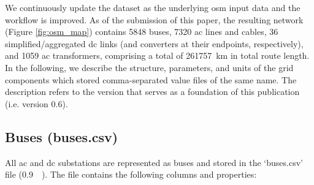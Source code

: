 \documentclass[fleqn,10pt]{wlscirep}
\let\autocite\cite
\begin{document}
We continuously update the dataset as the underlying \gls{osm} input data and the workflow is improved. As of the submission of this paper, the resulting network (Figure \ref{fig:osm_map}) contains 5848 buses, 7320 \acrshort{ac} lines and cables, 36 simplified/aggregated \acrshort{dc} links (and converters at their endpoints, respectively), and 1059 \acrshort{ac} transformers, comprising a total of \SI{261757}{\kilo\meter} in total route length. In the following, we describe the structure, parameters, and units of the grid components which stored comma-separated value files of the same name. The description refers to the version that serves as a foundation of this publication (i.e. version 0.6).\autocite{xiongPrebuiltElectricityNetwork2024}

\subsection*{Buses (buses.csv)}
All \acrshort{ac} and \acrshort{dc} substations are represented as buses and stored in the `buses.csv' file (\SI{0.9}{\mega\byte}). The file contains the following columns and properties:
\end{document}
